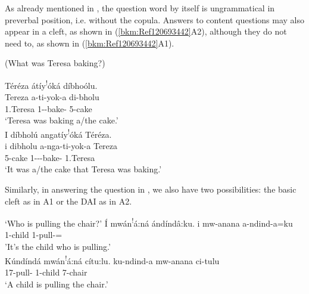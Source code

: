 \documentclass[output=paper]{langscibook}
\begin{document}
\z

As already mentioned in , the question word by itself is ungrammatical in preverbal position, i.e. without the copula. Answers to content questions may also appear in a cleft, as shown in (\ref{bkm:Ref120693442}A2), although they do not need to, as shown in (\ref{bkm:Ref120693442}A1).

\ea
(What was Teresa baking?)\\
\begin{xlist}[A2:]
\label{bkm:Ref120693442}
Téréza átíy\textsuperscript{!}óká díbhoólu.\\
\gll
Tereza  a-ti-yok-a  di-bholu\\
1.Teresa  1\SM{}-\IPFV{}-bake-\FV{}  5-cake\\
\glt
‘Teresa was baking a/the cake.’\\

I díbholú angatíy\textsuperscript{!}óká Téréza.\\
\gll
i  dibholu  a-nga-ti-yok-a  Tereza\\
\COP{}  5-cake  1\SM{}-\REL{}-\IPFV{}-bake-\FV{}  1.Teresa\\
\glt
‘It was a/the cake that Teresa was baking.’

\end{xlist}
\z

Similarly, in answering the question in , we also have two possibilities: the basic cleft as in A1 or the DAI as in A2.
\pagebreak

\ea
\begin{xlist}[A2:]
 ‘Who is pulling the chair?’
\label{bkm:Ref120693497}
Í mwán\textsuperscript{!}á:ná ándíndâ:ku.  \jambox*{[cleft]}
\gll
i  mw-anana  a-ndind-a=ku\\
\COP{}  1-child  1\SM{}-pull-\FV{}=\REL{}\\
\glt
'It’s the child who is pulling.’\\

Kúndíndá mwán\textsuperscript{!}á:ná cítu:lu.  \jambox*{[VSO]}
\gll
ku-ndind-a  mw-anana  ci-tulu\\
17\SM{}-pull-\FV{}  1-child  7-chair\\
\glt
‘A child is pulling the chair.’

\end{xlist}
\z
\end{document}
